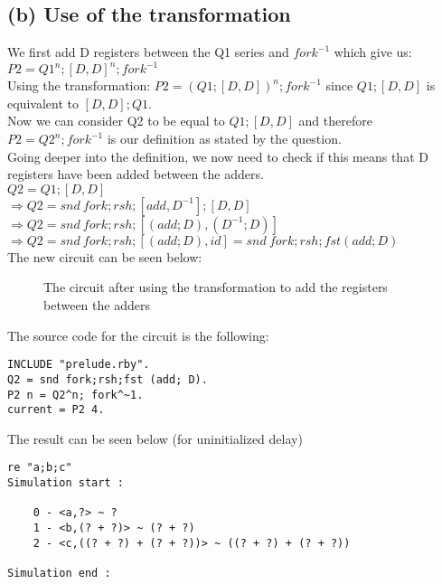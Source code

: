 \documentclass[a4paper,10pt]{article}
\begin{document}
\subsection*{(b) Use of the transformation}
We first add D registers between the Q1 series and $fork^{-1}$ which give us: $P2=Q1^n;[D,D]^n;fork^{-1}$\\[0.25cm] 
Using the transformation: $P2=(Q1;[D,D])^n;fork^{-1}$ since $Q1;[D,D]$ is equivalent to $[D,D];Q1$.\\[0.25cm] 
Now we can consider Q2 to be equal to $Q1;[D,D]$ and therefore $P2 = Q2^n;fork^{-1}$ is our definition as stated by the question.\\[0.25cm] 
Going deeper into the definition, we now need to check if this means that D registers have been added between the adders. \\[0.25cm] 
$Q2 = Q1;[D,D] $\\[0.25cm]
$\Rightarrow Q2 = snd\: fork;rsh;[add,D^{-1}];[D,D]$ \\[0.25cm]
$\Rightarrow Q2 = snd\: fork;rsh;[(add;D),(D^{-1};D)] $ \\[0.25cm]
$\Rightarrow Q2 = snd\: fork;rsh;[(add;D),id] = snd\: fork;rsh;fst(add;D)$
\\[0.5cm]
The new circuit can be seen below:
\begin{figure}[H]
\begin{center}

\caption{The circuit after using the transformation to add the registers between the adders}
\end{center}
\end{figure}
The source code for the circuit is the following:
\begin{Verbatim}
INCLUDE "prelude.rby".
Q2 = snd fork;rsh;fst (add; D).
P2 n = Q2^n; fork^~1. 
current = P2 4.
\end{Verbatim}
The result can be seen below (for uninitialized delay)
\begin{Verbatim}
re "a;b;c"
Simulation start :

    0 - <a,?> ~ ?
    1 - <b,(? + ?)> ~ (? + ?)
    2 - <c,((? + ?) + (? + ?))> ~ ((? + ?) + (? + ?))

Simulation end :
\end{Verbatim}
\end{document}
